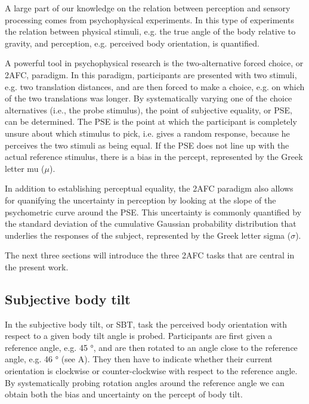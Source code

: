 A large part of our knowledge on the relation between perception and sensory processing comes from psychophysical experiments. In this type of experiments the relation between physical stimuli, e.g. the true angle of the body relative to gravity, and perception, e.g. perceived body orientation, is quantified.

A powerful tool in psychophysical research is the two-alternative forced choice, or 2AFC, paradigm. In this paradigm, participants are presented with two stimuli, e.g. two translation distances, and are then forced to make a choice, e.g. on which of the two translations was longer. By systematically varying one of the choice alternatives (i.e., the probe stimulus), the point of subjective equality, or PSE, can be determined. The PSE is the point at which the participant is completely unsure about which stimulus to pick, i.e. gives a random response, because he perceives the two stimuli as being equal. If the PSE does not line up with the actual reference stimulus, there is a bias in the percept, represented by the Greek letter mu ($\mu$).

In addition to establishing perceptual equality, the 2AFC paradigm also allows for quanifying the uncertainty in perception by looking at the slope of the psychometric curve around the PSE. This uncertainty is commonly quantified by the standard deviation of the cumulative Gaussian probability distribution that underlies the responses of the subject, represented by the Greek letter sigma ($\sigma$).


The next three sections will introduce the three 2AFC tasks that are central in the present work.

\subsection{Subjective body tilt}
In the subjective body tilt, or SBT, task the perceived body orientation with respect to a given body tilt angle is probed. Participants are first given a reference angle, e.g. 45 \si{\degree}, and are then rotated to an angle close to the reference angle, e.g. 46 \si{\degree} (see A). They then have to indicate whether their current orientation is clockwise or counter-clockwise with respect to the reference angle. By systematically probing rotation angles around the reference angle we can obtain both the bias and uncertainty on the percept of body tilt.

